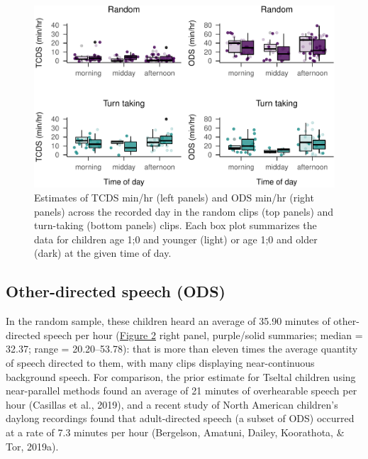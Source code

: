 \documentclass[,man,floatsintext]{apa6}
\begin{document}
\begin{figure}
\centering
\includegraphics{Yeli-CLE_files/figure-latex/fig3-1.pdf}
\caption{\label{fig:fig3}Estimates of TCDS min/hr (left panels) and ODS
min/hr (right panels) across the recorded day in the random clips (top
panels) and turn-taking (bottom panels) clips. Each box plot summarizes
the data for children age 1;0 and younger (light) or age 1;0 and older
(dark) at the given time of day.}
\end{figure}

\subsection{Other-directed speech
(ODS)}\label{other-directed-speech-ods}

In the random sample, these children heard an average of 35.90 minutes
of other-directed speech per hour (\protect\hyperlink{fig2}{Figure 2}
right panel, purple/solid summaries; median = 32.37; range =
20.20--53.78): that is more than eleven times the average quantity of
speech directed to them, with many clips displaying near-continuous
background speech. For comparison, the prior estimate for Tseltal
children using near-parallel methods found an average of 21 minutes of
overhearable speech per hour (Casillas et al., 2019), and a recent study
of North American children's daylong recordings found that
adult-directed speech (a subset of ODS) occurred at a rate of 7.3
minutes per hour (Bergelson, Amatuni, Dailey, Koorathota, \& Tor,
2019a).
\end{document}
